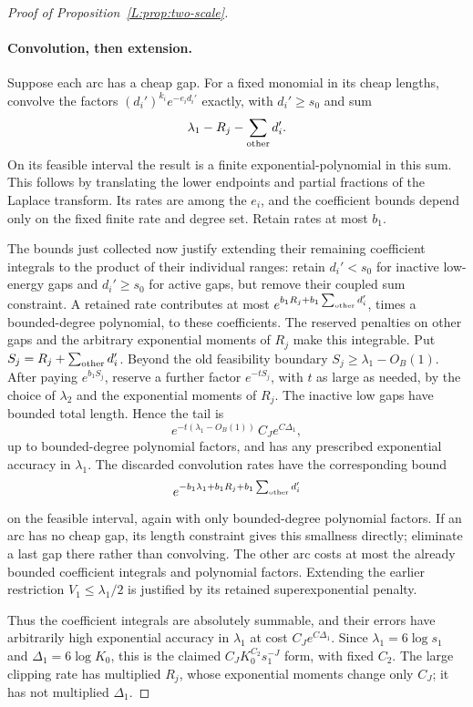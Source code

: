 \documentclass[11pt]{article}
\numberwithin{equation}{section}
\theoremstyle{definition}\newtheorem{definition}[theorem]{Definition}
\theoremstyle{remark}\newtheorem{remark}[theorem]{Remark}
\begin{document}
\begin{proof}[Proof of Proposition~\ref{L:prop:two-scale}]
\paragraph{Convolution, then extension.}
Suppose each arc has a cheap gap. For a fixed monomial in its cheap
lengths, convolve the factors $(d_i')^{k_i}e^{-e_i d_i'}$ exactly,
with $d_i'\ge s_0$ and sum
\[
            \lambda_1-R_j-\sum_{\rm other}d_i'.
\]
On its feasible interval the result is a finite exponential-polynomial
in this sum. This follows by translating the lower endpoints and
partial fractions of the Laplace transform. Its rates are among the
$e_i$, and the coefficient bounds depend only on the fixed finite rate
and degree set. Retain rates at most $b_1$.

The bounds just collected now justify extending their remaining
coefficient integrals to the product of their individual ranges: retain
$d_i'<s_0$ for inactive low-energy gaps and $d_i'\ge s_0$ for active
gaps, but remove their coupled sum constraint. A retained rate contributes
at most $e^{b_1R_j+b_1\sum_{\rm other}d_i'}$, times a bounded-degree
polynomial, to these coefficients. The reserved penalties on other
gaps and the arbitrary exponential moments of $R_j$ make this
integrable. Put $S_j=R_j+\sum_{\rm other}d_i'$. Beyond the old feasibility
boundary $S_j\ge\lambda_1-O_B(1)$. After paying $e^{b_1S_j}$,
reserve a further factor $e^{-tS_j}$, with $t$ as large as needed,
by the choice of $\lambda_2$ and the exponential moments of $R_j$.
The inactive low gaps have bounded total length. Hence the tail is
\[
 e^{-t(\lambda_1-O_B(1))}\,C_J e^{C\Delta_1},
\]
up to bounded-degree polynomial factors, and has any prescribed
exponential accuracy in $\lambda_1$. The discarded convolution rates
have the corresponding bound
\[
       e^{-b_1\lambda_1+b_1R_j+b_1\sum_{\rm other}d_i'}
\]
on the feasible interval, again with only bounded-degree polynomial
factors. If an arc has no cheap gap, its length constraint gives this
smallness directly; eliminate a last gap there rather than convolving.
The other arc costs at most the already bounded coefficient integrals
and polynomial factors. Extending the earlier restriction
$V_1\le\lambda_1/2$ is justified by its retained superexponential
penalty.

Thus the coefficient integrals are absolutely summable, and their
errors have arbitrarily high exponential accuracy in $\lambda_1$ at
cost $C_J e^{C\Delta_1}$. Since
$\lambda_1=6\log s_1$ and $\Delta_1=6\log K_0$, this is the claimed
$C_JK_0^{C_2}s_1^{-J}$ form, with fixed $C_2$. The large clipping rate
has multiplied $R_j$, whose exponential moments change only $C_J$;
it has not multiplied $\Delta_1$.


\end{proof}
\end{document}
